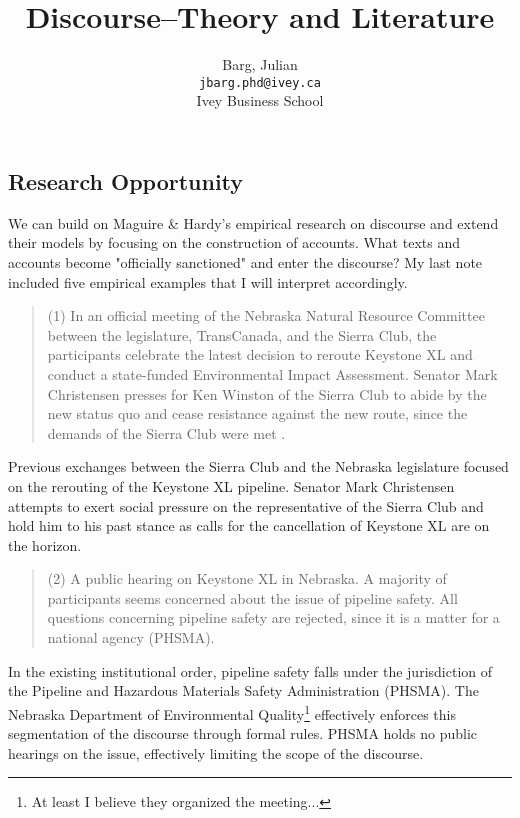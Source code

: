 \documentclass{article}
\title{Discourse--Theory and Literature}
\author{
	Barg, Julian\\
	\texttt{jbarg.phd@ivey.ca}\\
	Ivey Business School
}
\begin{document}
	\maketitle
	\clearpage

	

	

	

	\subsection*{Research Opportunity}

	We can build on Maguire \& Hardy's empirical research on discourse and extend their models by focusing on the construction of accounts. What texts and accounts become "officially sanctioned" and enter the discourse? My last note included five empirical examples that I will interpret accordingly.

	\begin{quote}
		(1) In an official meeting of the Nebraska Natural Resource Committee between the legislature, TransCanada, and the Sierra Club, the participants celebrate the latest decision to reroute Keystone XL and conduct a state-funded Environmental Impact Assessment. Senator Mark Christensen presses for Ken Winston of the Sierra Club to abide by the new status quo and cease resistance against the new route, since the demands of the Sierra Club were met \citep{NRC2011}.
	\end{quote}

	Previous exchanges between the Sierra Club and the Nebraska legislature focused on the rerouting of the Keystone XL pipeline. Senator Mark Christensen attempts to exert social pressure on the representative of the Sierra Club and hold him to his past stance as calls for the cancellation of Keystone XL are on the horizon.

	\begin{quote}
		(2) A public hearing on Keystone XL in Nebraska. A majority of participants seems concerned about the issue of pipeline safety. All questions concerning pipeline safety are rejected, since it is a matter for a national agency (PHSMA).
	\end{quote}

	In the existing institutional order, pipeline safety falls under the jurisdiction of the Pipeline and Hazardous Materials Safety Administration (PHSMA). The Nebraska Department of Environmental Quality\footnote{At least I believe they organized the meeting...} effectively enforces this segmentation of the discourse through formal rules. PHSMA holds no public hearings on the issue, effectively limiting the scope of the discourse.
\end{document}

